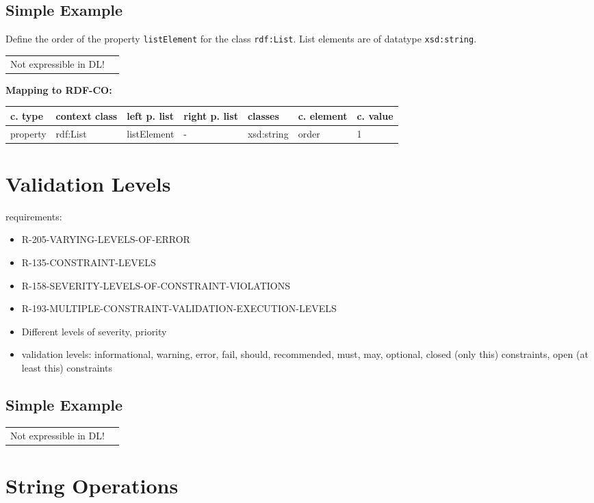 \documentclass{llncs}
\newcommand{\ms}[1]{\texttt{#1}}
\newenvironment{gcotable}{
  \scriptsize
  \sffamily
  \vspace{0cm}
	\begin{center}
	\textbf{\vspace{0.4cm}Mapping to RDF-CO:} \\
  \begin{tabular}{l|l|l|l|l|l|l}
	\hline
  \textbf{c. type} & \textbf{context class} & \textbf{left p. list} & \textbf{right p. list} & \textbf{classes} & \textbf{c. element} & \textbf{c. value} \\
  \hline

}{
  \hline
  \end{tabular}
	\end{center}
}
\newenvironment{DL}{
  \vspace{0cm}
	\begin{center}
  \begin{tabular}{r l}

}{
  \end{tabular}
	\end{center}
}
\begin{document}
\subsection{Simple Example}

Define the order of the property \ms{listElement} for the class \ms{rdf:List}.
List elements are of datatype \ms{xsd:string}.

\begin{DL}
Not expressible in DL!
\end{DL}

\begin{gcotable}
property & rdf:List & listElement & - & xsd:string & order & 1 \\
\end{gcotable}

\section{Validation Levels}

requirements:

\begin{itemize}
	\item R-205-VARYING-LEVELS-OF-ERROR
	\item R-135-CONSTRAINT-LEVELS
	\item R-158-SEVERITY-LEVELS-OF-CONSTRAINT-VIOLATIONS
	\item R-193-MULTIPLE-CONSTRAINT-VALIDATION-EXECUTION-LEVELS
\end{itemize}

\begin{itemize}
  \item Different levels of severity, priority
	\item validation levels: informational, warning, error, fail, should, recommended, must, may, optional, closed (only this) constraints, open (at least this) constraints
\end{itemize}

\subsection{Simple Example}

\begin{DL}
Not expressible in DL!
\end{DL}

\section{String Operations}
\end{document}

